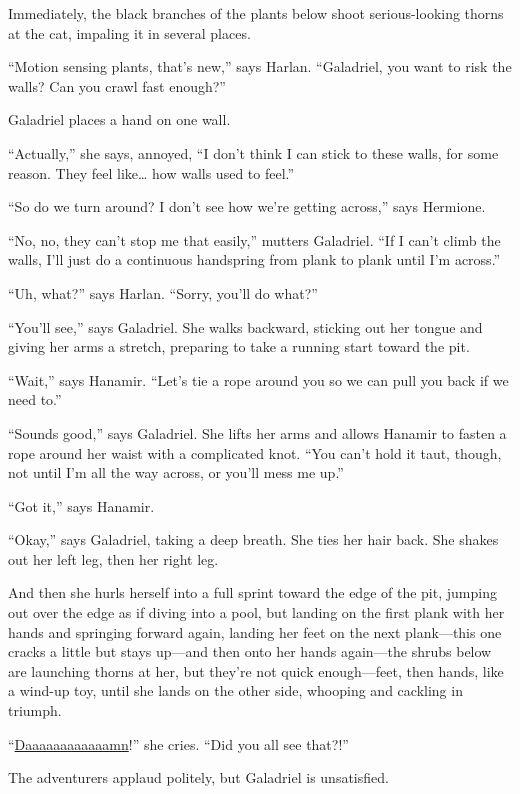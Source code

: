 \documentclass[smalldemyvopaper,11pt,twoside,onecolumn,openright,extrafontsizes]{memoir}
\begin{document}
Immediately, the black branches of the plants below shoot
serious-looking thorns at the cat, impaling it in several places.

``Motion sensing plants, that's new,'' says Harlan. ``Galadriel, you
want to risk the walls? Can you crawl fast enough?''

Galadriel places a hand on one wall.

``Actually,'' she says, annoyed, ``I don't think I can stick to these
walls, for some reason. They feel like\ldots{} how walls used to feel.''

``So do we turn around? I don't see how we're getting across,'' says
Hermione.

``No, no, they can't stop me that easily,'' mutters Galadriel. ``If I
can't climb the walls, I'll just do a continuous handspring from plank
to plank until I'm across.''

``Uh, what?'' says Harlan. ``Sorry, you'll do what?''

``You'll see,'' says Galadriel. She walks backward, sticking out her
tongue and giving her arms a stretch, preparing to take a running start
toward the pit.

``Wait,'' says Hanamir. ``Let's tie a rope around you so we can pull you
back if we need to.''

``Sounds good,'' says Galadriel. She lifts her arms and allows Hanamir
to fasten a rope around her waist with a complicated knot. ``You can't
hold it taut, though, not until I'm all the way across, or you'll mess
me up.''

``Got it,'' says Hanamir.

``Okay,'' says Galadriel, taking a deep breath. She ties her hair back.
She shakes out her left leg, then her right leg.

And then she hurls herself into a full sprint toward the edge of the
pit, jumping out over the edge as if diving into a pool, but landing on
the first plank with her hands and springing forward again, landing her
feet on the next plank---this one cracks a little but stays up---and
then onto her hands again---the shrubs below are launching thorns at
her, but they're not quick enough---feet, then hands, like a wind-up
toy, until she lands on the other side, whooping and cackling in
triumph.

``\href{https://youtu.be/hHFPuBywhEg?t=3s}{Daaaaaaaaaaaamn}!'' she
cries. ``Did you all see that?!''

The adventurers applaud politely, but Galadriel is unsatisfied.
\end{document}
